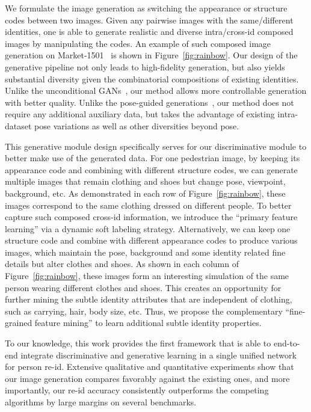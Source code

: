 \documentclass[10pt,twocolumn,letterpaper]{article}
\begin{document}
We formulate the image generation as switching the appearance or structure codes between two images. Given any pairwise images with the same/different identities, one is able to generate realistic and diverse intra/cross-id composed images by manipulating the codes. An example of such composed image generation on Market-1501~\cite{zheng2015scalable} is shown in Figure~\ref{fig:rainbow}. Our design of the generative pipeline not only leads to high-fidelity generation, but also yields substantial diversity given the 
combinatorial compositions of existing identities. Unlike the unconditional GANs~\cite{zheng2017unlabeled, huang2018multi}, our method allows more controllable generation with better quality. Unlike the pose-guided generations~\cite{qian2017pose,ge2018fdgan, liu2018pose}, our method does not require any additional auxiliary data, but takes the advantage of existing intra-dataset pose variations as well as other diversities beyond pose. 

This generative module design specifically serves for our discriminative module to better make use of the generated data. For one pedestrian image, by keeping its appearance code and combining with different structure codes, we can generate multiple images that remain clothing and shoes but change pose, viewpoint, background, etc. As demonstrated in each row of Figure~\ref{fig:rainbow}, these images correspond to the same clothing dressed on different people. To better capture such composed cross-id information, we introduce the ``primary feature learning'' via a dynamic soft labeling strategy. Alternatively, we can keep one structure code and combine with different appearance codes to produce various images, which maintain the pose, background and some identity related fine details but alter clothes and shoes. As shown in each column of Figure~\ref{fig:rainbow}, these images form an interesting simulation of the same person wearing different clothes and shoes. This creates an opportunity for further mining the subtle identity attributes that are independent of clothing, such as carrying, hair, body size, etc. Thus, we propose the complementary ``fine-grained feature mining'' to learn additional subtle identity properties. 

To our knowledge, this work provides the first framework that is able to end-to-end integrate discriminative and generative learning in a single unified network for person re-id. Extensive qualitative and quantitative experiments show that our image generation compares favorably against the existing ones, and more importantly, our re-id accuracy consistently outperforms the competing algorithms by large margins on several benchmarks. 
\end{document}
